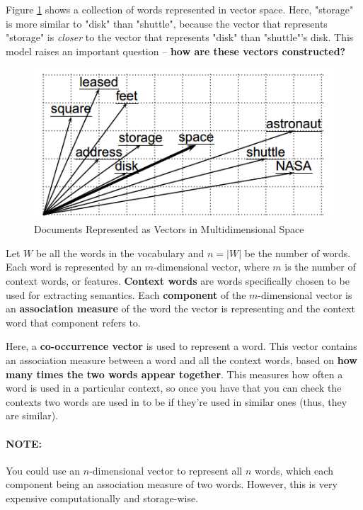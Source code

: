 \documentclass{article}
\begin{document}
Figure \ref{fig:vector-space-model} shows a collection of words represented in vector space. Here, "storage" is more similar to "disk" than "shuttle", because the vector that represents "storage" is \textit{closer} to the vector that represents "disk" than "shuttle"'s disk. This model raises an important question -- \textbf{how are these vectors constructed?}

\begin{figure}
	\centering
	\includegraphics[scale=0.6]{figures/vector-space-model.png}
	\caption{Documents Represented as Vectors in Multidimensional Space}
	\label{fig:vector-space-model}
\end{figure}

Let $W$ be all the words in the vocabulary and $n = |W|$ be the number of words. Each word is represented by an $m$-dimensional vector, where $m$ is the number of context words, or features. \textbf{Context words} are words specifically chosen to be used for extracting semantics.  Each \textbf{component} of the $m$-dimensional vector is an \textbf{association measure} of the word the vector is representing and the context word that component refers to. 

Here, a \textbf{co-occurrence vector} is used to represent a word. This vector contains an association measure between a word and all the context words, based on \textbf{how many times the two words appear together}. This measures how often a word is used in a particular context, so once you have that you can check the contexts two words are used in to be if they're used in similar ones (thus, they are similar).

\paragraph{\textbf{NOTE:} } You could use an $n$-dimensional vector to represent all $n$ words, which each component being an association measure of two words. However, this is very expensive computationally and storage-wise.
\end{document}
